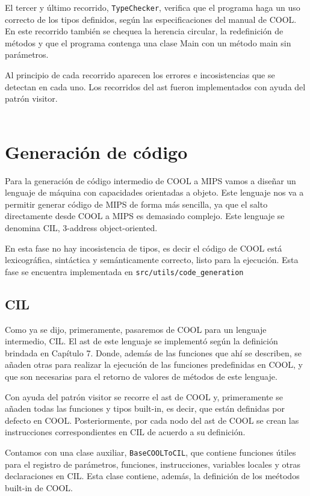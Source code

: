 \documentclass[twoside]{article}
\begin{document}
El tercer y \'ultimo recorrido, \texttt{TypeChecker}, verifica que el programa haga un uso correcto de los tipos definidos, seg\'un las especificaciones del manual de COOL. En este recorrido tambi\'en se chequea la herencia circular, la redefinici\'on de m\'etodos y que el programa contenga una clase Main con un m\'etodo main sin par\'ametros. 

Al principio de cada recorrido aparecen los errores e incosistencias que se detectan en cada uno. Los recorridos del ast fueron implementados con ayuda del patr\'on visitor.\\\\


\section{Generaci\'on de c\'odigo}
Para la generaci\'on de c\'odigo intermedio de COOL a MIPS vamos a dise\~nar un lenguaje de m\'aquina con capacidades orientadas a objeto. Este lenguaje nos va a permitir generar c\'odigo de MIPS de forma m\'as sencilla, ya que el salto directamente desde COOL a MIPS es demasiado complejo. Este lenguaje se denomina CIL, 3-address object-oriented.

En esta fase no hay incosistencia de tipos, es decir el c\'odigo de COOL est\'a lexicogr\'afica, sint\'actica y sem\'anticamente correcto, listo para la ejecuci\'on. Esta fase se encuentra implementada en \texttt{src/utils/code\_generation}

\subsection{CIL}
Como ya se dijo, primeramente, pasaremos de COOL para un lenguaje intermedio, CIL. El ast de este lenguaje se implement\'o seg\'un la definici\'on brindada en \cite{compilers} Cap\'itulo 7. Donde, adem\'as de las funciones que ah\'i se describen, se a\~naden otras para realizar la ejecuci\'on de las funciones predefinidas en COOL, y que son necesarias para el retorno de valores de m\'etodos de este lenguaje.

Con ayuda del patr\'on visitor se recorre el ast de COOL y, primeramente se a\~naden todas las funciones y tipos built-in, es decir, que est\'an definidas por defecto en COOL. Posteriormente, por cada nodo del ast de COOL se crean las instrucciones correspondientes en CIL de acuerdo a su definici\'on.

Contamos con una clase auxiliar, \texttt{BaseCOOLToCIL}, que contiene funciones \'utiles para el registro de par\'ametros, funciones, instrucciones, variables locales y otras declaraciones en CIL. Esta clase contiene, adem\'as, la definici\'on de los me\'etodos built-in de COOL.\\
\end{document}
